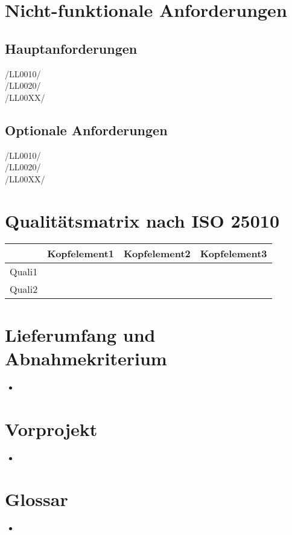 \documentclass[11pt,a4paper]{scrreprt}
\begin{document}
\chapter{Nicht-funktionale Anforderungen}
\section{Hauptanforderungen}
\begin{description}
\item[/LL0010/]
\item[/LL0020/]
\item[/LL00XX/]
\end{description}
\section{Optionale Anforderungen}
\begin{description}
\item[/LL0010/]
\item[/LL0020/]
\item[/LL00XX/]
\end{description}

\chapter{Qualitätsmatrix nach ISO 25010}
\begin{tabular}{|l|c|c|c|}
\hline
		& Kopfelement1 & Kopfelement2 & Kopfelement3 \\
\hline
Quali1  &              &              &              \\     
Quali2  &              &              &              \\     
\hline
\end{tabular}

\chapter{Lieferumfang und Abnahmekriterium}
\begin{itemize}
\item
\end{itemize}

\chapter{Vorprojekt}
\begin{itemize}
\item
\end{itemize}

\chapter{Glossar}
\begin{itemize}
\item
\end{itemize}
\end{document}
